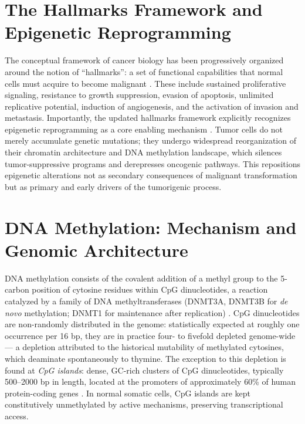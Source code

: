 \section{The Hallmarks Framework and Epigenetic Reprogramming}

The conceptual framework of cancer biology has been progressively organized
around the notion of ``hallmarks'': a set of functional capabilities that normal
cells must acquire to become malignant \cite{Hanahan2011, Hanahan2000}. These
include sustained proliferative signaling, resistance to growth suppression, evasion
of apoptosis, unlimited replicative potential, induction of angiogenesis, and the
activation of invasion and metastasis.
Importantly, the updated hallmarks framework explicitly recognizes epigenetic
reprogramming as a core enabling mechanism \cite{Hanahan2011}. Tumor cells do not
merely accumulate genetic mutations; they undergo widespread reorganization of
their chromatin architecture and DNA methylation landscape, which silences
tumor-suppressive programs and derepresses oncogenic pathways. This repositions
epigenetic alterations not as secondary consequences of malignant transformation
but as primary and early drivers of the tumorigenic process.

\section{DNA Methylation: Mechanism and Genomic Architecture}
\label{sec:methylation_mechanism}

DNA methylation consists of the covalent addition of a methyl group to the
5-carbon position of cytosine residues within CpG dinucleotides, a reaction
catalyzed by a family of DNA methyltransferases (DNMT3A, DNMT3B for \textit{de novo}
methylation; DNMT1 for maintenance after replication) \cite{bird2002}.
CpG dinucleotides are non-randomly distributed in the genome: statistically
expected at roughly one occurrence per 16 bp, they are in practice four- to
fivefold depleted genome-wide — a depletion attributed to the historical
mutability of methylated cytosines, which deaminate spontaneously to thymine.
The exception to this depletion is found at \textit{CpG islands}: dense,
GC-rich clusters of CpG dinucleotides, typically 500–2000 bp in length,
located at the promoters of approximately 60\% of human protein-coding genes
\cite{bird2002}. In normal somatic cells, CpG islands are kept constitutively
unmethylated by active mechanisms, preserving transcriptional access.

